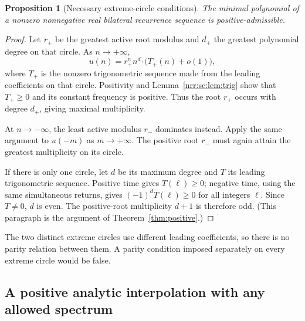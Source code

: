 \documentclass[11pt,letterpaper]{article}
\newtheorem{proposition}[theorem]{Proposition}
\theoremstyle{definition}
\theoremstyle{remark}
\begin{document}
\begin{proposition}[Necessary extreme-circle conditions]
\label{nrr:sc:prop:positive-necessary}
The minimal polynomial of a nonzero nonnegative real bilateral
recurrence sequence is positive-admissible.
\end{proposition}
\begin{proof}
Let $r_+$ be the greatest active root modulus and $d_+$ the greatest
polynomial degree on that circle. As $n\to+\infty$,
\[
 u(n)=r_+^n n^{d_+}\bigl(T_+(n)+o(1)\bigr),
\]
where $T_+$ is the nonzero trigonometric sequence made from the leading
coefficients on that circle. Positivity and Lemma~\ref{nrr:sc:lem:trig} show
that $T_+\ge0$ and its constant frequency is positive. Thus the root
$r_+$ occurs with degree $d_+$, giving maximal multiplicity.

At $n\to-\infty$, the least active modulus $r_-$ dominates instead.
Apply the same argument to $u(-m)$ as $m\to+\infty$. The positive root
$r_-$ must again attain the greatest multiplicity on its circle.

If there is only one circle, let $d$ be its maximum degree and $T$ its
leading trigonometric sequence. Positive time gives $T(\ell)\ge0$;
negative time, using the same simultaneous returns, gives
$(-1)^dT(\ell)\ge0$ for all integers $\ell$. Since $T\ne0$, $d$ is even.
The positive-root multiplicity $d+1$ is therefore odd. (This paragraph is
the argument of Theorem~\ref{thm:positive}.)
\end{proof}

The two distinct extreme circles use different leading coefficients,
so there is no parity relation between them. A parity condition imposed
separately on every extreme circle would be false.

\subsection{A positive analytic interpolation with any allowed spectrum}
\end{document}
